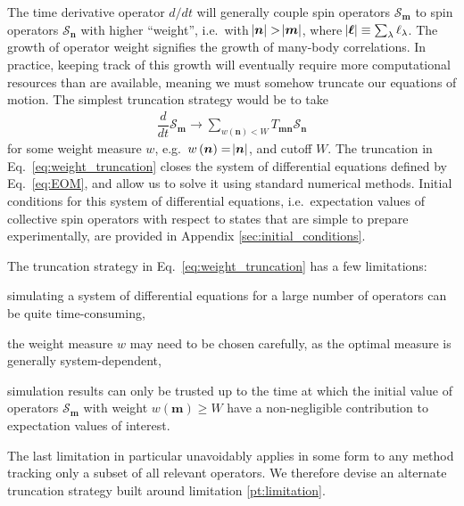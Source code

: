 \documentclass[pra,reprint,longbibliography]{revtex4-1}
\newcommand{\f}[2]{\dfrac{#1}{#2}} %
\newcommand{\p}[1]{\left(#1\right)} %
\renewcommand{\v}{\bm} %
\renewcommand{\S}{\mathcal{S}}
\newcommand{\1}{\mathds{1}}
\begin{document}
The time derivative operator $d/dt$ will generally couple spin
operators $\S_{\v m}$ to spin operators $\S_{\v n}$ with higher
``weight'', i.e.~with $\abs{\v n}>\abs{\v m}$, where
$\abs{\v\ell}\equiv\sum_\lambda\ell_\lambda$.  The growth of operator
weight signifies the growth of many-body correlations.  In practice,
keeping track of this growth will eventually require more
computational resources than are available, meaning we must somehow
truncate our equations of motion.  The simplest truncation strategy
would be to take
\begin{align}
  \f{d}{dt} \S_{\v m}
  \to \sum_{w\p{\v n}<W} T_{\v m\v n} \S_{\v n}
  \label{eq:weight_truncation}
\end{align}
for some weight measure $w$, e.g.~$w\p{\v n}=\abs{\v n}$, and cutoff
$W$.  The truncation in Eq.~\eqref{eq:weight_truncation} closes the
system of differential equations defined by Eq.~\eqref{eq:EOM}, and
allow us to solve it using standard numerical methods.  Initial
conditions for this system of differential equations, i.e.~expectation
values of collective spin operators with respect to states that are
simple to prepare experimentally, are provided in Appendix
\ref{sec:initial_conditions}.

The truncation strategy in Eq.~\eqref{eq:weight_truncation} has a few
limitations:
\begin{enumerate*}[label=(\roman*)]
\item simulating a system of differential equations for a large number
  of operators can be quite time-consuming,
\item the weight measure $w$ may need to be chosen carefully, as the
  optimal measure is generally system-dependent,
\item simulation results can only be trusted up to the time at which
  the initial value of operators $\S_{\v m}$ with weight
  $w\p{\v m}\ge W$ have a non-negligible contribution to expectation
  values of interest.\label{pt:limitation}
\end{enumerate*}
The last limitation in particular unavoidably applies in some form to
any method tracking only a subset of all relevant operators.  We
therefore devise an alternate truncation strategy built around
limitation \ref{pt:limitation}.
\end{document}
